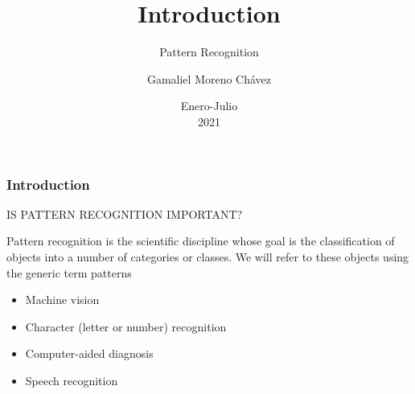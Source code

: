 \documentclass[spanish]{beamer}
\begin{document}
\title{Introduction}
\subtitle{Pattern Recognition}
\author{Gamaliel Moreno Chávez}
\date{Enero-Julio\\ 2021}%

\frame{\titlepage}

\begin{frame}
\frametitle{Introduction}
IS PATTERN RECOGNITION IMPORTANT?

Pattern recognition is the scientific discipline whose goal is the classification of
objects into a number of categories or classes. We will refer to these objects using the generic term patterns

\begin{itemize}
\item Machine vision
\item Character (letter or number) recognition
\item Computer-aided diagnosis
\item Speech recognition
\end{itemize}


\end{frame}
\end{document}
